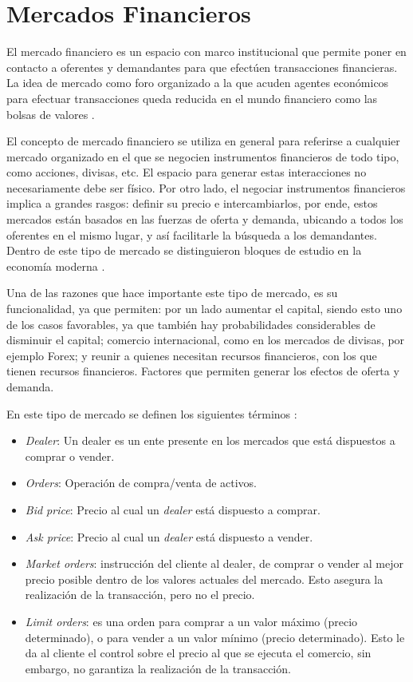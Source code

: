 \section{Mercados Financieros}

El mercado financiero es un espacio con marco institucional que permite poner
en contacto a oferentes y demandantes para que efectúen transacciones
financieras. La idea de mercado como foro organizado a la que acuden agentes
económicos para efectuar transacciones queda reducida en el mundo financiero
como las bolsas de valores \cite{mishkin2006financial}.

El concepto de mercado financiero se utiliza en general para referirse a
cualquier mercado organizado en el que se negocien instrumentos financieros de
todo tipo, como acciones, divisas, etc. El espacio para generar estas
interacciones no necesariamente debe ser físico. Por otro lado, el negociar
instrumentos financieros implica a grandes rasgos: definir su precio e
intercambiarlos, por ende, estos mercados están basados en las fuerzas de
oferta y demanda, ubicando a todos los oferentes en el mismo lugar, y así
facilitarle la búsqueda a los demandantes. Dentro de este tipo de mercado se
distinguieron bloques de estudio en la economía moderna
\cite{jensen1984theory}.

Una de las razones que hace importante este tipo de mercado, es su
funcionalidad, ya que permiten: por un lado aumentar el capital, siendo esto
uno de los casos favorables, ya que también hay probabilidades considerables de
disminuir el capital; comercio internacional, como en los mercados de divisas,
por ejemplo Forex; y reunir a quienes necesitan recursos financieros, con los
que tienen recursos financieros. Factores que permiten generar los efectos de
oferta y demanda.

En este tipo de mercado se definen los siguientes términos \cite{nevmyvaka2003electronic}:
\begin{itemize}
	\item \emph{Dealer}: Un dealer es un ente presente en los mercados que está
dispuestos a comprar o vender.
	\item \emph{Orders}: Operación de compra/venta de activos.
	\item \emph{Bid price}: Precio al cual un \emph{dealer} está dispuesto a
comprar.
	\item \emph{Ask price}: Precio al cual un \emph{dealer} está dispuesto a
vender.
	\item \emph{Market orders}: instrucción del cliente al dealer, de comprar o
vender al mejor precio posible dentro de los valores actuales del mercado.
Esto asegura la realización de la transacción, pero no el precio.
	\item \emph{Limit orders}: es una orden para comprar a un valor máximo
(precio determinado), o para vender a un valor mínimo (precio determinado).
Esto le da al cliente el control sobre el precio al que se ejecuta el comercio,
sin embargo, no garantiza la realización de la transacción.
\end{itemize}

